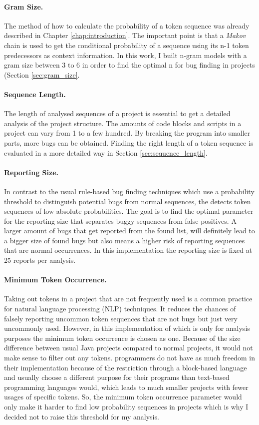 \paragraph{Gram Size.}
The method of how to calculate the probability of a token sequence was already described in Chapter \ref{chap:introduction}. The important point is that a \emph{Makov} chain is used to get the conditional probability of a sequence using its n-1 token predecessors as context information. In this work, I built n-gram models with a gram size between 3 to 6 in order to find the optimal n for bug finding in \scratch{} projects (Section \ref{sec:gram_size}. 
\paragraph{Sequence Length.}
The length of analysed sequences of a project is essential to get a detailed analysis of the project structure. The amounts of code blocks and scripts in a \scratch{} project can vary from 1 to a few hundred. By breaking the program into smaller parts, more bugs can be obtained. Finding the right length of a token sequence is evaluated in a more detailed way in Section \ref{sec:sequence_length}.
\paragraph{Reporting Size.}
In contrast to the usual rule-based bug finding techniques which use a probability threshold to distinguish potential bugs from normal sequences, the \ngram{} detects token sequences of low absolute probabilities. The goal is to find the optimal parameter for the reporting size that separates buggy sequences from false positives. A larger amount of bugs that get reported from the found list, will definitely lead to a bigger size of found bugs but also means a higher risk of reporting sequences that are normal occurrences. In this implementation the reporting size is fixed at 25 reports per analysis.
\paragraph{Minimum Token Occurrence.}
Taking out tokens in a project that are not frequently used is a common practice for natural language processing (NLP) techniques. It reduces the chances of falsely reporting uncommon token sequences that are not bugs but just very uncommonly used. However, in this implementation of \ngram{} which is only for \scratch{} analysis purposes the minimum token occurrence is chosen as one. Because of the size difference between usual Java projects compared to normal \scratch{} projects, it would not make sense to filter out any tokens. \scratch{} programmers do not have as much freedom in their implementation because of the restriction through a block-based language and usually choose a different purpose for their programs than text-based programming languages would, which leads to much smaller projects with fewer usages of specific tokens. So, the minimum token occurrence parameter would only make it harder to find low probability sequences in projects which is why I decided not to raise this threshold for my analysis.


